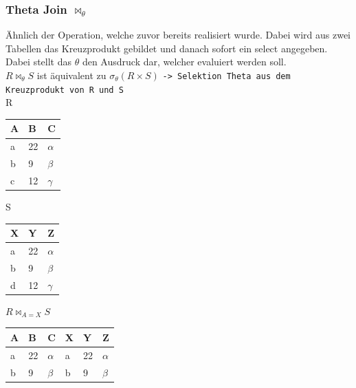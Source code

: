 \documentclass{article}
\begin{document}
	\subsubsection{Theta Join \texorpdfstring{$\bowtie_\theta$}{}}
 	Ähnlich der Operation, welche zuvor bereits realisiert wurde. Dabei wird aus zwei Tabellen das Kreuzprodukt gebildet und danach sofort ein select angegeben. Dabei stellt das $\theta$ den Ausdruck dar, welcher evaluiert werden soll. \\
 	$R \bowtie_\theta S$ ist äquivalent zu $\sigma_{\theta}(R\times S)$ \verb|-> Selektion Theta aus dem Kreuzprodukt von R und S| \\
 	 	R
 	\begin{tabular}{| l | l | l |}
 		\toprule
 		A & B & C \\ \midrule
 		a & 22 & $\alpha$ \\
 		b & 9 & $\beta$ \\
 		c & 12 & $\gamma$ \\
 		\bottomrule
 \end{tabular} \hspace{0.5cm}
 S
 	\begin{tabular}{| l | l | l |}
 		\toprule
 		X & Y & Z \\ \midrule
 		a & 22 & $\alpha$ \\
 		b & 9 & $\beta$ \\
 		d & 12 & $\gamma$ \\
 		\bottomrule
 \end{tabular} \hspace{0.5cm}
 $R \bowtie_{A=X} S$
 \begin{tabular}{| l | l | l | l | l | l |}
 		\toprule
 		A & B & C & X & Y & Z  \\ \midrule
 		a & 22 & $\alpha$ & a & 22 & $\alpha$ \\
 		b & 9 & $\beta$ & b & 9 & $\beta$ \\
 		\bottomrule
 \end{tabular} 
\end{document}
